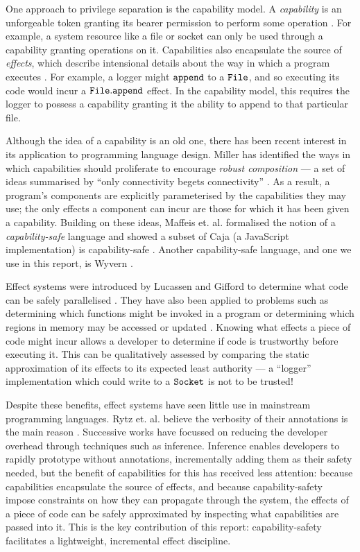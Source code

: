 One approach to privilege separation is the capability model. A \textit{capability} is an unforgeable token granting its bearer permission to perform some operation \cite{dennis66}. For example, a system resource like a file or socket can only be used through a capability granting operations on it. Capabilities also encapsulate the source of \textit{effects}, which describe intensional details about the way in which a program executes \cite{nielson99}. For example, a logger might $\mathtt{append}$ to a $\mathtt{File}$, and so executing its code would incur a $\mathtt{File.append}$ effect. In the capability model, this requires the logger to possess a capability granting it the ability to append to that particular file.

Although the idea of a capability is an old one, there has been recent interest in its application to programming language design. Miller has identified the ways in which capabilities should proliferate to encourage \textit{robust composition} --- a set of ideas summarised by ``only connectivity begets connectivity'' \cite{miller06}. As a result, a program's components are explicitly parameterised by the capabilities they may use; the only effects a component can incur are those for which it has been given a capability. Building on these ideas, Maffeis et. al. formalised the notion of a \textit{capability-safe} language and showed a subset of Caja (a JavaScript implementation) is capability-safe \cite{maffeis10}. Another capability-safe language, and one we use in this report, is Wyvern \cite{nistor13}.

Effect systems were introduced by Lucassen and Gifford to determine what code can be safely parallelised \cite{lucassen88}. They have also been applied to problems such as determining which functions might be invoked in a program \cite{tang94} or determining which regions in memory may be accessed or updated \cite{talpin94}. Knowing what effects a piece of code might incur allows a developer to determine if code is trustworthy before executing it. This can be qualitatively assessed by comparing the static approximation of its effects to its expected least authority --- a ``logger'' implementation which could write to a $\mathtt{Socket}$ is not to be trusted!

Despite these benefits, effect systems have seen little use in mainstream programming languages. Rytz et. al. believe the verbosity of their annotations is the main reason \citep{rytz12}. Successive works have focussed on reducing the developer overhead through techniques such as inference. Inference enables developers to rapidly prototype without annotations, incrementally adding them as their safety needed, but the benefit of capabilities for this has received less attention: because capabilities encapsulate the source of effects, and because capability-safety impose constraints on how they can propagate through the system, the effects of a piece of code can be safely approximated by inspecting what capabilities are passed into it. This is the key contribution of this report: capability-safety facilitates a lightweight, incremental effect discipline.

